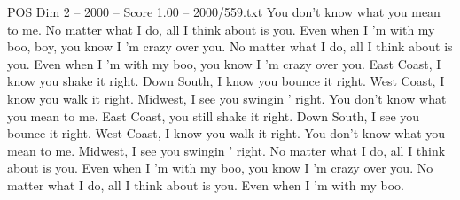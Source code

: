 \begin{textsample}{POS Dim 2 – 2000 – Score 1.00 – 2000/559.txt}
You don't know what you mean to me.
No matter what I do, all I think about is you.
Even when I 'm with my boo, boy, you know I 'm crazy over you.
No matter what I do, all I think about is you.
Even when I 'm with my boo, you know I 'm crazy over you.
East Coast, I know you shake it right.
Down South, I know you bounce it right.
West Coast, I know you walk it right.
Midwest, I see you swingin ' right.
You don't know what you mean to me.
East Coast, you still shake it right.
Down South, I see you bounce it right.
West Coast, I know you walk it right.
You don't know what you mean to me.
Midwest, I see you swingin ' right.
No matter what I do, all I think about is you.
Even when I 'm with my boo, you know I 'm crazy over you.
No matter what I do, all I think about is you.
Even when I 'm with my boo.

\end{textsample}
